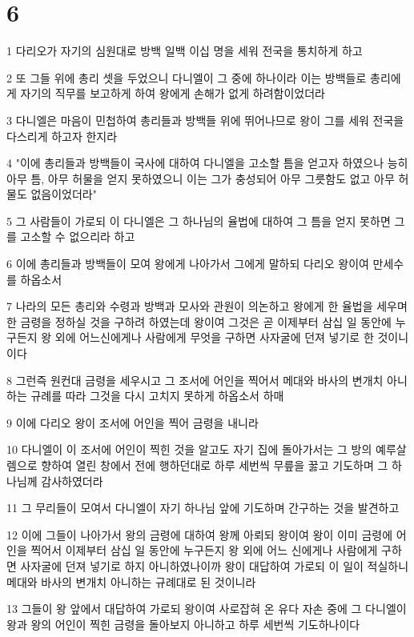 \chapter{6}

\par 1 다리오가 자기의 심원대로 방백 일백 이십 명을 세워 전국을 통치하게 하고
\par 2 또 그들 위에 총리 셋을 두었으니 다니엘이 그 중에 하나이라 이는 방백들로 총리에게 자기의 직무를 보고하게 하여 왕에게 손해가 없게 하려함이었더라
\par 3 다니엘은 마음이 민첩하여 총리들과 방백들 위에 뛰어나므로 왕이 그를 세워 전국을 다스리게 하고자 한지라
\par 4 "이에 총리들과 방백들이 국사에 대하여 다니엘을 고소할 틈을 얻고자 하였으나 능히 아무 틈, 아무 허물을 얻지 못하였으니 이는 그가 충성되어 아무 그릇함도 없고 아무 허물도 없음이었더라"
\par 5 그 사람들이 가로되 이 다니엘은 그 하나님의 율법에 대하여 그 틈을 얻지 못하면 그를 고소할 수 없으리라 하고
\par 6 이에 총리들과 방백들이 모여 왕에게 나아가서 그에게 말하되 다리오 왕이여 만세수를 하옵소서
\par 7 나라의 모든 총리와 수령과 방백과 모사와 관원이 의논하고 왕에게 한 율법을 세우며 한 금령을 정하실 것을 구하려 하였는데 왕이여 그것은 곧 이제부터 삼십 일 동안에 누구든지 왕 외에 어느신에게나 사람에게 무엇을 구하면 사자굴에 던져 넣기로 한 것이니이다
\par 8 그런즉 원컨대 금령을 세우시고 그 조서에 어인을 찍어서 메대와 바사의 변개치 아니하는 규례를 따라 그것을 다시 고치지 못하게 하옵소서 하매
\par 9 이에 다리오 왕이 조서에 어인을 찍어 금령을 내니라
\par 10 다니엘이 이 조서에 어인이 찍힌 것을 알고도 자기 집에 돌아가서는 그 방의 예루살렘으로 향하여 열린 창에서 전에 행하던대로 하루 세번씩 무릎을 꿇고 기도하며 그 하나님께 감사하였더라
\par 11 그 무리들이 모여서 다니엘이 자기 하나님 앞에 기도하며 간구하는 것을 발견하고
\par 12 이에 그들이 나아가서 왕의 금령에 대하여 왕께 아뢰되 왕이여 왕이 이미 금령에 어인을 찍어서 이제부터 삼십 일 동안에 누구든지 왕 외에 어느 신에게나 사람에게 구하면 사자굴에 던져 넣기로 하지 아니하였나이까 왕이 대답하여 가로되 이 일이 적실하니 메대와 바사의 변개치 아니하는 규례대로 된 것이니라
\par 13 그들이 왕 앞에서 대답하여 가로되 왕이여 사로잡혀 온 유다 자손 중에 그 다니엘이 왕과 왕의 어인이 찍힌 금령을 돌아보지 아니하고 하루 세번씩 기도하나이다
